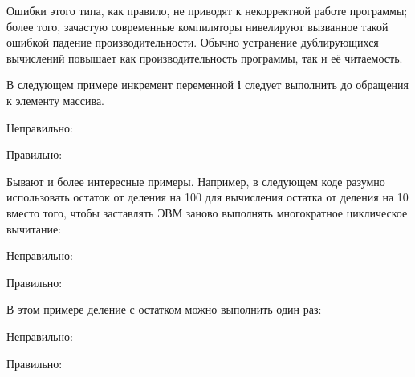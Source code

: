 \begin{typerror}
	\label{TE_duplicate-calculations}

	Ошибки этого типа, как правило, не приводят к некорректной работе программы;
	более того, зачастую современные компиляторы нивелируют вызванное такой ошибкой падение производительности.
	Обычно устранение дублирующихся вычислений повышает как производительность программы, так и её читаемость.

	В следующем примере инкремент переменной \textbf{i} следует выполнить до обращения к элементу массива.

	Неправильно:

	Правильно:

	Бывают и более интересные примеры.
	Например, в следующем коде разумно использовать остаток от деления на 100 для вычисления остатка от деления на 10 вместо того, чтобы заставлять ЭВМ заново выполнять многократное циклическое вычитание:

	Неправильно:

	Правильно:

	В этом примере деление с остатком можно выполнить один раз:

	Неправильно:

	Правильно:

	
\end{typerror}
